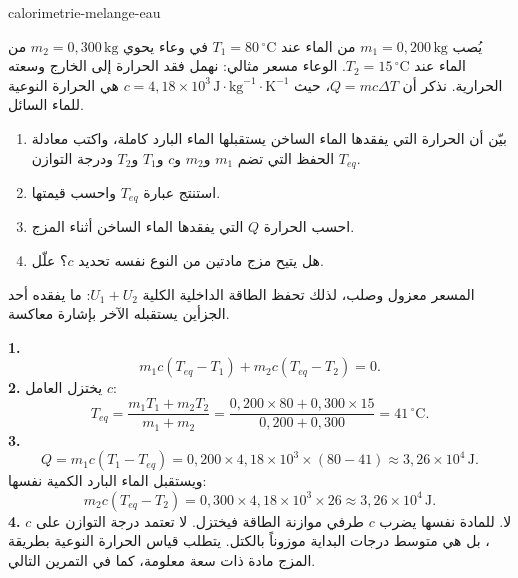 \begin{exo}{calorimetrie-melange-eau}

يُصب $m_1=0{,}200\,\text{kg}$ من الماء عند $T_1=80\,^\circ\text{C}$ في وعاء يحوي $m_2=0{,}300\,\text{kg}$ من الماء عند $T_2=15\,^\circ\text{C}$. الوعاء مسعر مثالي: نهمل فقد الحرارة إلى الخارج وسعته الحرارية. نذكر أن $Q=mc\Delta T$، حيث $c=4{,}18\times10^3\,\text{J}\!\cdot\!\text{kg}^{-1}\!\cdot\!\text{K}^{-1}$ هي الحرارة النوعية للماء السائل.
\begin{enumerate}
  \item بيّن أن الحرارة التي يفقدها الماء الساخن يستقبلها الماء البارد كاملة، واكتب معادلة الحفظ التي تضم $m_1$ و$m_2$ و$c$ و$T_1$ و$T_2$ ودرجة التوازن $T_{eq}$.
  \item استنتج عبارة $T_{eq}$ واحسب قيمتها.
  \item احسب الحرارة $Q$ التي يفقدها الماء الساخن أثناء المزج.
  \item هل يتيح مزج مادتين من النوع نفسه تحديد $c$؟ علّل.
\end{enumerate}
\begin{indication}
المسعر معزول وصلب، لذلك تحفظ الطاقة الداخلية الكلية $U_1+U_2$: ما يفقده أحد الجزأين يستقبله الآخر بإشارة معاكسة.
\end{indication}
\begin{solution}
\textbf{1.}
\[
m_1c(T_{eq}-T_1)+m_2c(T_{eq}-T_2)=0.
\]
\textbf{2.} يختزل العامل $c$:
\[
T_{eq}=\frac{m_1T_1+m_2T_2}{m_1+m_2}
=\frac{0{,}200\times80+0{,}300\times15}{0{,}200+0{,}300}=41\,^\circ\text{C}.
\]
\textbf{3.}
\[
Q=m_1c(T_1-T_{eq})=0{,}200\times4{,}18\times10^3\times(80-41)
\approx3{,}26\times10^4\,\text{J}.
\]
ويستقبل الماء البارد الكمية نفسها:
\[
m_2c(T_{eq}-T_2)=0{,}300\times4{,}18\times10^3\times26
\approx3{,}26\times10^4\,\text{J}.
\]
\textbf{4.} لا. للمادة نفسها يضرب $c$ طرفي موازنة الطاقة فيختزل. لا تعتمد درجة التوازن على $c$، بل هي متوسط درجات البداية موزوناً بالكتل. يتطلب قياس الحرارة النوعية بطريقة المزج مادة ذات سعة معلومة، كما في التمرين التالي.
\end{solution}
\end{exo}

